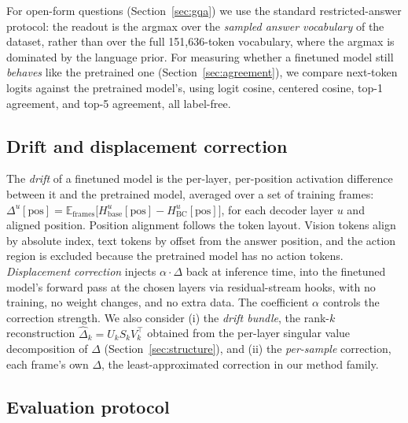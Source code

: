 \documentclass{article}
\begin{document}
For open-form questions (Section~\ref{sec:gqa}) we use the standard restricted-answer
protocol: the readout is the argmax over the \emph{sampled answer vocabulary} of the dataset,
rather than over the full 151{,}636-token vocabulary, where the argmax is dominated by the
language prior. For measuring whether a finetuned model still \emph{behaves} like the pretrained
one (Section~\ref{sec:agreement}), we compare next-token logits against the pretrained
model's, using logit cosine, centered cosine, top-1 agreement, and top-5 agreement, all
label-free.

\subsection{Drift and displacement correction}
\label{sec:drift}

The \emph{drift} of a finetuned model is the per-layer, per-position activation difference
between it and the pretrained model, averaged over a set of training frames:
$\Delta^u[\mathrm{pos}] = \mathbb{E}_{\mathrm{frames}}\big[H^u_{\mathrm{base}}[\mathrm{pos}]
- H^u_{\mathrm{BC}}[\mathrm{pos}]\big]$, for each decoder layer $u$ and aligned position.
Position alignment follows the token layout. Vision tokens align by absolute index, text
tokens by offset from the answer position, and the action region is excluded because the
pretrained model has no action tokens. \emph{Displacement correction} injects $\alpha\cdot\Delta$ back at
inference time, into the finetuned model's forward pass at the chosen layers via
residual-stream hooks, with no training, no weight changes, and no extra data. The
coefficient $\alpha$ controls the correction strength. We also
consider (i) the \emph{drift bundle}, the rank-$k$ reconstruction
$\hat\Delta_k = U_k S_k V_k^{\top}$ obtained from the per-layer singular value decomposition of
$\Delta$ (Section~\ref{sec:structure}), and (ii) the \emph{per-sample} correction, each frame's
own $\Delta$, the least-approximated correction in our method family.

\subsection{Evaluation protocol}
\label{sec:protocol}
\end{document}
